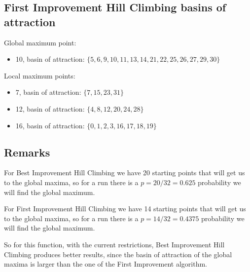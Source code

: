 \documentclass[a4paper]{article}
\begin{document}
\subsection{First Improvement Hill Climbing basins of attraction}

Global maximum point: 
\begin{itemize}
	\item 10, basin of attraction: $\{5, 6, 9, 10, 11, 13, 14, 21, 22, 25, 26, 27, 29, 30\}$
\end{itemize}

Local maximum points:
\begin{itemize}
	\item 7, basin of attraction: $\{7, 15, 23, 31\}$
	\item 12, basin of attraction: $\{4, 8, 12, 20, 24, 28\}$
	\item 16, basin of attraction: $\{0, 1, 2, 3, 16, 17, 18, 19\}$
\end{itemize}

\subsection{Remarks}

For Best Improvement Hill Climbing we have 20 starting points that will get us to the global maxima, so for a run there is a $p = 20/32 = 0.625$ probability we will find the global maximum.

For First Improvement Hill Climbing we have 14 starting points that will get us to the global maxima, so for a run there is a $p = 14/32 = 0.4375$ probability we will find the global maximum.

So for this function, with the current restrictions, Best Improvement Hill Climbing produces better results, since the basin of attraction of the global maxima is larger than the one of the First Improvement algorithm.
\end{document}
